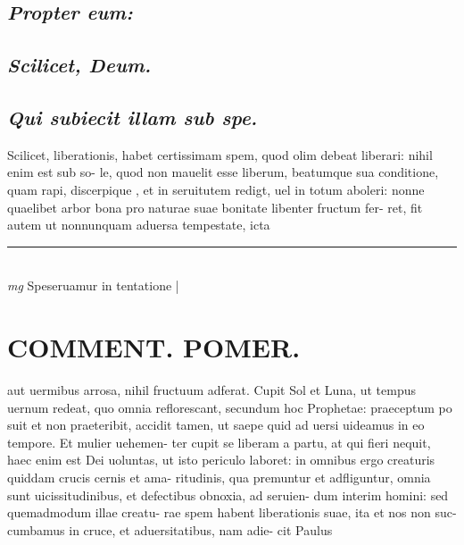 \documentclass{article}
\begin{document}
\begin{pages}
\subsection*{\textit{Propter eum: }}
{}
\subsection*{\textit{Scilicet, Deum.  }}
{}
\subsection*{\textit{Qui subiecit illam sub spe. }}\pstart Scilicet, liberationis, habet certissimam spem, quod olim debeat liberari: nihil enim est sub so- le, quod non mauelit esse liberum, beatumque sua conditione, quam rapi, discerpique , et in seruitutem redigt, uel in totum aboleri: nonne quaelibet arbor bona pro naturae suae bonitate libenter fructum fer- ret, fit autem ut nonnunquam aduersa tempestate, icta  \pend
\vspace{0.5cm}\noindent
\vspace{0.2cm}\rule{1cm}{0.2pt}\\ 
\hspace{0.2cm}\textit{mg}
\footnotesize Speseruamur in tentatione 
\normalsize| 
\section*{COMMENT. POMER.  }\pstart aut uermibus arrosa, nihil fructuum adferat. Cupit Sol et Luna, ut tempus uernum redeat, quo omnia reflorescant, secundum hoc Prophetae: praeceptum po suit et non praeteribit, accidit tamen, ut saepe quid ad uersi uideamus in eo tempore. Et mulier uehemen- ter cupit se liberam a partu, at qui fieri nequit, haec enim est Dei uoluntas, ut isto periculo laboret: in omnibus ergo creaturis quiddam crucis cernis et ama- ritudinis, qua premuntur et adfliguntur, omnia sunt uicissitudinibus, et defectibus obnoxia, ad seruien- dum interim homini: sed quemadmodum illae creatu- rae spem habent liberationis suae, ita et nos non suc- cumbamus in cruce, et aduersitatibus, nam adie- cit Paulus  \pend
{}
{}

\end{pages}
\end{document}
